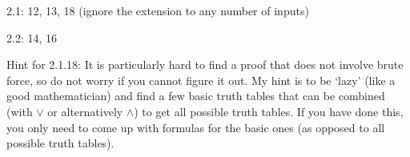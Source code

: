 \documentclass[11pt]{article}
\begin{document}
\begin{list}{\textbf{Problem .}}{ \setlength{\leftmargin}{0in}}
2.1: 12, 13, 18 (ignore the extension to any number of inputs)

2.2: 14, 16

Hint for 2.1.18: It is particularly hard to find a proof that does not involve brute force, so do not worry if you cannot figure it out.  My hint is to be `lazy' (like a good mathematician) and find a few basic truth tables that can be combined (with $\vee$ or alternatively $\wedge$) to get all possible truth tables.  If you have done this, you only need to come up with formulas for the basic ones (as opposed to all possible truth tables).



 
\end{list}
\end{document}
